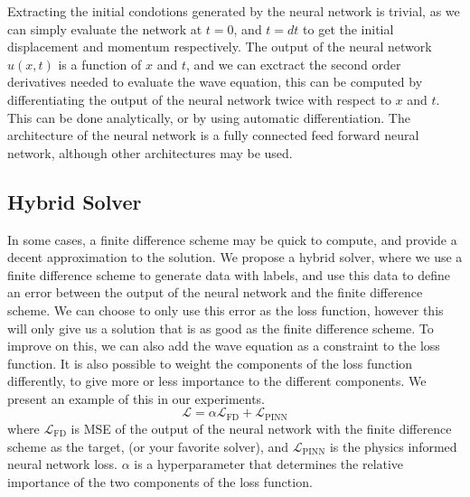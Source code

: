 \documentclass[twoside,11pt]{report}
\begin{document}
    Extracting the initial condotions generated by the neural network is trivial, as we can simply evaluate the network
    at $t=0$, and $t=dt$ to get the initial displacement and momentum respectively. The output of the neural network
    $u(x,t)$ is a function of $x$ and $t$, and we can exctract the second order derivatives
    needed to evaluate the wave equation, this can be computed by differentiating the output of the neural network twice
    with respect to $x$ and $t$. This can be done analytically, or by using automatic differentiation.
    The architecture of the neural network is a fully connected feed forward neural network, although other architectures
    may be used.
    \\
    \cite{fys-stk}
    \cite{krishnapriyan2021characterizing}



\subsection{Hybrid Solver}
\label{sec:hybrid}
     
    In some cases, a finite difference
    scheme may be quick to compute, and provide a decent approximation to the solution. We propose a hybrid solver, where
    we use a finite difference scheme to generate data with labels, and use this data to define an error between the
    output of the neural network and the finite difference scheme. We can choose to only use this error
    as the loss function, however this will only give us a solution that is as good as the finite difference scheme.
    To improve on this, we can also add the wave equation as a constraint to the loss function.
    It is also possible to weight the components of the loss function differently, to give more or less 
    importance to the different components. We present an example of this in our experiments.
    \begin{equation}
    \mathcal{L} = \alpha\mathcal{L}_{\text{FD}} + \mathcal{L}_{\text{PINN}}
    \end{equation}
    where $\mathcal{L}_{\text{FD}}$ is MSE of the output of the neural network with the finite difference scheme as 
    the target,
    (or your favorite solver), 
    and $\mathcal{L}_{\text{PINN}}$ is the physics informed neural network loss. $\alpha$ is a hyperparameter
    that determines the relative importance of the two components of the loss function.
    \\
    \cite{krishnapriyan2021characterizing}
\end{document}
